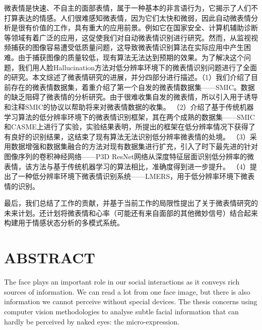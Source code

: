 微表情是快速、不自主的面部表情，属于一种基本的非言语行为，它揭示了人们不打算表达的情感。人们很难感知微表情，因为它们太快和微弱，因此自动微表情分析是很有价值的工作，具有重大的应用前景。例如它在国家安全、计算机辅助诊断等领域有着广泛的应用，这促使我们对自动微表情识别进行研究。然而，从监视视频捕获的图像容易遭受低质量问题，这导致微表情识别算法在实际应用中产生困难。由于捕获图像的质量较低，现有算法无法达到预期的效果。为了解决这个问题，我们用人脸Hallucination方法对低分辨率环境下的微表情识别问题进行了全面的研究。本文综述了微表情研究的进展，并分四部分进行描述。（1）我们介绍了目前存在的微表情数据集，着重介绍了第一个自发的微表情数据集——SMIC。数据的缺乏阻碍了微表情的分析研究。由于很难收集自发的微表情，所以引入用于诱导和注释SMIC的协议以帮助将来对微表情数据的收集。 （2）介绍了基于传统机器学习算法的低分辨率环境下的微表情识别框架，其在两个成熟的数据集——SMIC和CASME上进行了实验，实验结果表明，所提出的框架在低分辨率情况下获得了有良好的识别结果，这结束了现有算法无法识别低分辨率微表情的处境。 （3）采用数据增强和数据集融合的方法对现有数据集进行扩充，引入了时下最先进的针对图像序列的卷积神经网络——P3D ResNet网络从深度特征层面识别低分辨率的微表情，该方法与基于传统机器学习的算法相比，准确度得到进一步提升。 （4）提出了一种低分辨率环境下微表情识别系统——LMERS，用于低分辨率环境下微表情的识别。

最后，我们总结了工作的贡献，并基于当前工作的局限性提出了关于微表情研究的未来计划。还计划将微表情和心率（可能还有来自面部的其他微妙信号）结合起来构建用于情感状态分析的多模式系统。


\chapter{ABSTRACT}%

\noindent

The face plays an important role in our social interactions as it conveys rich sources of information. We can read a lot from one face image, but there is also information we cannot perceive without special devices. The thesis concerns using computer vision methodologies to analyse subtle facial information that can hardly be perceived by naked eyes: the micro-expression.

